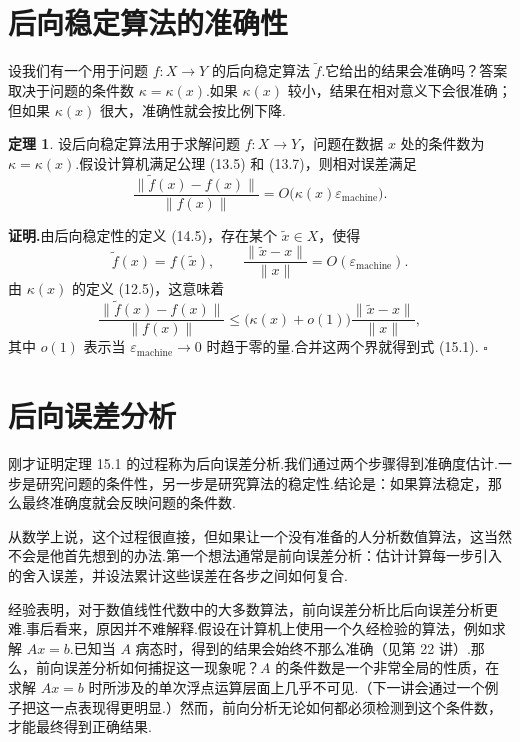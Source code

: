 \documentclass[UTF8,fontset=none,12pt]{ctexart}
\newcommand{\epsmach}{\varepsilon_{\mathrm{machine}}}
\theoremstyle{definition}
\newtheorem{theorem}{定理}
\begin{document}
\section*{后向稳定算法的准确性}

设我们有一个用于问题 $f:X\to Y$ 的后向稳定算法 $\widetilde f$.它给出的结果会准确吗？答案取决于问题的条件数 $\kappa=\kappa(x)$.如果 $\kappa(x)$ 较小，结果在相对意义下会很准确；但如果 $\kappa(x)$ 很大，准确性就会按比例下降.

\begin{theorem}
设后向稳定算法用于求解问题 $f:X\to Y$，问题在数据 $x$ 处的条件数为 $\kappa=\kappa(x)$.假设计算机满足公理 (13.5) 和 (13.7)，则相对误差满足
\begin{equation}
    \frac{\|\widetilde f(x)-f(x)\|}{\|f(x)\|}
    =O\bigl(\kappa(x)\epsmach\bigr).
    \tag{15.1}
\end{equation}
\end{theorem}

\textbf{证明.}由后向稳定性的定义 (14.5)，存在某个 $\widetilde x\in X$，使得
\[
    \widetilde f(x)=f(\widetilde x),
    \qquad
    \frac{\|\widetilde x-x\|}{\|x\|}
    =O(\epsmach).
\]
由 $\kappa(x)$ 的定义 (12.5)，这意味着
\begin{equation}
    \frac{\|\widetilde f(x)-f(x)\|}{\|f(x)\|}
    \le
    \bigl(\kappa(x)+o(1)\bigr)
    \frac{\|\widetilde x-x\|}{\|x\|},
    \tag{15.2}
\end{equation}
其中 $o(1)$ 表示当 $\epsmach\to0$ 时趋于零的量.合并这两个界就得到式 (15.1). \hfill$\square$

\section*{后向误差分析}

刚才证明定理 15.1 的过程称为后向误差分析.我们通过两个步骤得到准确度估计.一步是研究问题的条件性，另一步是研究算法的稳定性.结论是：如果算法稳定，那么最终准确度就会反映问题的条件数.

从数学上说，这个过程很直接，但如果让一个没有准备的人分析数值算法，这当然不会是他首先想到的办法.第一个想法通常是前向误差分析：估计计算每一步引入的舍入误差，并设法累计这些误差在各步之间如何复合.

经验表明，对于数值线性代数中的大多数算法，前向误差分析比后向误差分析更难.事后看来，原因并不难解释.假设在计算机上使用一个久经检验的算法，例如求解 $Ax=b$.已知当 $A$ 病态时，得到的结果会始终不那么准确（见第 22 讲）.那么，前向误差分析如何捕捉这一现象呢？$A$ 的条件数是一个非常全局的性质，在求解 $Ax=b$ 时所涉及的单次浮点运算层面上几乎不可见.（下一讲会通过一个例子把这一点表现得更明显.）然而，前向分析无论如何都必须检测到这个条件数，才能最终得到正确结果.
\end{document}
